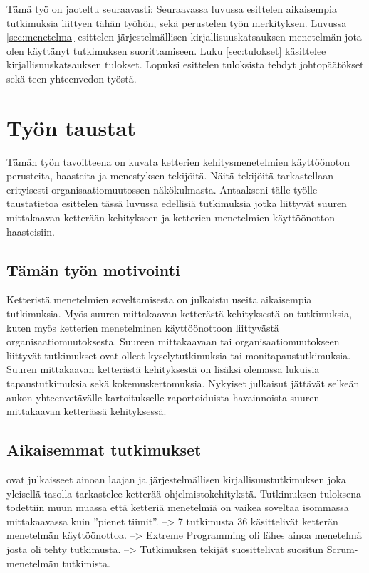 Tämä työ on jaoteltu seuraavasti:
Seuraavassa luvussa esittelen aikaisempia tutkimuksia liittyen tähän työhön,
sekä perustelen työn merkityksen. Luvussa \ref{sec:menetelma} esittelen
järjestelmällisen kirjallisuuskatsauksen menetelmän jota olen käyttänyt
tutkimuksen suorittamiseen. Luku \ref{sec:tulokset} käsittelee
kirjallisuuskatsauksen tulokset. Lopuksi esittelen tuloksista tehdyt
johtopäätökset sekä teen yhteenvedon työstä.



\section{Työn taustat}
\label{sec:tausta}

Tämän työn tavoitteena on kuvata ketterien kehitysmenetelmien käyttöönoton
perusteita, haasteita ja menestyksen tekijöitä. Näitä tekijöitä tarkastellaan
erityisesti organisaatiomuutossen näkökulmasta. Antaakseni tälle työlle
taustatietoa esittelen tässä luvussa edellisiä tutkimuksia jotka liittyvät
suuren mittakaavan ketterään kehitykseen ja ketterien menetelmien käyttöönotton
haasteisiin.

\subsection{Tämän työn motivointi}
Ketteristä menetelmien soveltamisesta on julkaistu useita aikaisempia
tutkimuksia. Myös suuren mittakaavan ketterästä kehityksestä on tutkimuksia,
kuten myös ketterien menetelminen käyttöönottoon liittyvästä
organisaatiomuutoksesta. Suureen mittakaavaan tai organisaatiomuutokseen
liittyvät tutkimukset ovat olleet kyselytutkimuksia tai monitapaustutkimuksia.
Suuren mittakaavan ketterästä kehityksestä on lisäksi olemassa lukuisia
tapaustutkimuksia sekä kokemuskertomuksia. Nykyiset julkaisut jättävät selkeän
aukon yhteenvetävälle kartoitukselle raportoiduista havainnoista suuren
mittakaavan ketterässä kehityksessä.

\subsection{Aikaisemmat tutkimukset}

\cite{Dyba2008} ovat julkaisseet ainoan laajan ja järjestelmällisen
kirjallisuustutkimuksen joka yleisellä tasolla tarkastelee ketterää
ohjelmistokehitykstä. Tutkimuksen tuloksena todettiin muun muassa että ketteriä
menetelmiä on vaikea soveltaa isommassa mittakaavassa kuin ''pienet tiimit''.
--> 7 tutkimusta 36 käsittelivät ketterän menetelmän käyttöönottoa.
--> Extreme Programming oli lähes ainoa menetelmä josta oli tehty tutkimusta.
--> Tutkimuksen tekijät suosittelivat suositun Scrum-menetelmän tutkimista.
\citep{Dyba2008}

